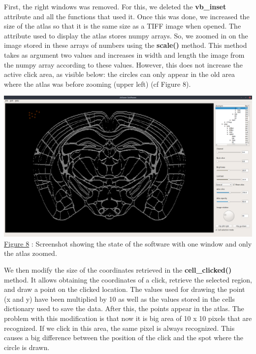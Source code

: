 \documentclass[a4paper,12pt]{report}
\begin{document}
First, the right windows was removed. For this, we deleted the \textbf{vb\_inset} attribute and all the functions that used it. Once this was done, we increased the size of the atlas so that it is the same size as a TIFF image when opened. The attribute used to display the atlas stores numpy arrays. So, we zoomed in on the image stored in these arrays of numbers using the \textbf{scale()} method. This method takes as argument two values and increases in width and length the image from the numpy array according to these values. However, this does not increase the active click area, as visible below: the circles can only appear in the old area where the atlas was before zooming (upper left) (cf Figure 8).\\
\begin{center} \includegraphics[scale=0.22]{bigAtlasBugSelec.png}\\
\underline{Figure 8} : Screenshot showing the state of the software with one window and only the atlas zoomed. \vspace{1\baselineskip}\\ \end{center}

We then modify the size of the coordinates retrieved in the \textbf{cell\_clicked()} method. It allows obtaining the coordinates of a click, retrieve the selected region, and draw a point on the clicked location. The values used for drawing the point (x and y) have been multiplied by 10 as well as the values stored in the cells dictionary used to save the data. After this, the points appear in the atlas. The problem with this modification is that now it is big area of 10 x 10 pixels that are recognized. If we click in this area, the same pixel is always recognized. This causes a big difference between the position of the click and the spot where the circle is drawn.\\
\end{document}
